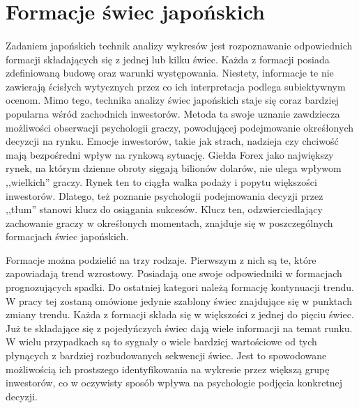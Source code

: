 \documentclass[pdflatex,11pt]{aghdpl}
\begin{document}
\section{Formacje świec japońskich}
\label{swiece_rozdzial}
\paragraph{}
Zadaniem japońskich technik analizy wykresów jest rozpoznawanie odpowiednich formacji składających się z jednej lub kilku świec. Każda z formacji posiada zdefiniowaną budowę oraz warunki występowania. Niestety, informacje te nie zawierają ścisłych wytycznych przez co ich interpretacja podlega subiektywnym ocenom. Mimo tego, technika analizy świec japońskich staje się coraz bardziej popularna wśród zachodnich inwestorów. Metoda ta swoje uznanie zawdziecza możliwości obserwacji psychologii graczy, powodującej podejmowanie okreśłonych decyzcji na rynku. Emocje inwestorów, takie jak strach, nadzieja czy chciwość mają bezpośredni wpływ na rynkową sytuację. Giełda Forex jako największy rynek, na którym dzienne obroty sięgają bilionów dolarów, nie ulega wpływom ,,wielkich'' graczy. Rynek ten to ciągła walka podaży i popytu większości inwestorów. Dlatego, też poznanie psychologii podejmowania decyzji przez ,,tłum'' stanowi klucz do osiągania sukcesów. Klucz ten, odzwierciedlający zachowanie graczy w okreśłonych momentach, znajduje się w poszczególnych formacjach świec japońskich. 

Formacje można podzielić na trzy rodzaje. Pierwszym z nich są te, które zapowiadają trend wzrostowy. Posiadają one swoje odpowiedniki w formacjach prognozujących spadki. Do ostatniej kategori należą formację kontynuacji trendu. W pracy tej zostaną omówione jedynie szablony świec znajdujące się w punktach zmiany trendu. Każda z formacji składa się w większości z jednej do pięciu świec. Już te składające się z pojedyńczych świec dają wiele informacji na temat runku. W wielu przypadkach są to sygnały o wiele bardziej wartościowe od tych płynących z bardziej rozbudowanych sekwencji świec. Jest to spowodowane możliwością ich prostszego identyfikowania na wykresie przez większą grupę inwestorów, co w oczywisty sposób wpływa na psychologie podjęcia konkretnej decyzji. 
\end{document}
